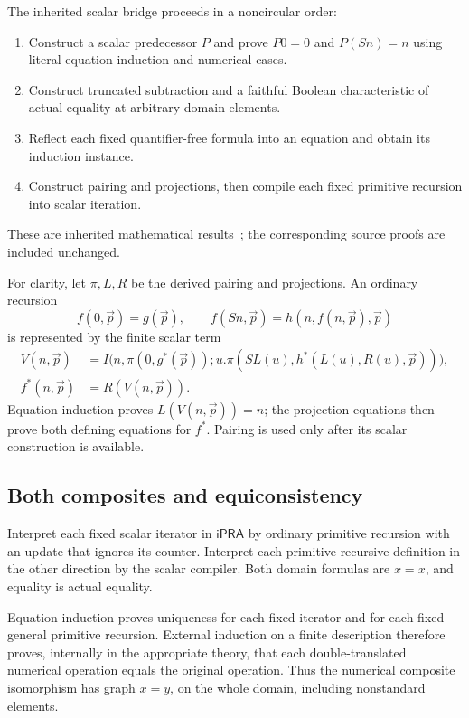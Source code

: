 \documentclass[11pt,letterpaper]{article}
\theoremstyle{definition}
\newcommand{\ipra}{\mathsf{iPRA}}
\begin{document}
The inherited scalar bridge proceeds in a noncircular order:
\begin{enumerate}
\item Construct a scalar predecessor $P$ and prove $P0=0$ and
      $P(Sn)=n$ using literal-equation induction and numerical cases.
\item Construct truncated subtraction and a faithful Boolean
      characteristic of actual equality at arbitrary domain elements.
\item Reflect each fixed quantifier-free formula into an equation
      and obtain its induction instance.
\item Construct pairing and projections, then compile each fixed
      primitive recursion into scalar iteration.
\end{enumerate}
These are inherited mathematical results~\cite{erasure,forward,progress};
the corresponding source proofs are included unchanged.

For clarity, let $\pi,L,R$ be the derived pairing and projections.
An ordinary recursion
\[
 f(0,\vec p)=g(\vec p),\qquad
 f(Sn,\vec p)=h(n,f(n,\vec p),\vec p)
\]
is represented by the finite scalar term
\begin{align*}
 V(n,\vec p)
   &=I\bigl(n,\pi(0,g^*(\vec p));
       u.\pi(SL(u),h^*(L(u),R(u),\vec p))\bigr),\\
 f^*(n,\vec p)&=R(V(n,\vec p)).
\end{align*}
Equation induction proves $L(V(n,\vec p))=n$; the projection
equations then prove both defining equations for $f^*$. Pairing
is used only after its scalar construction is available.

\subsection{Both composites and equiconsistency}

Interpret each fixed scalar iterator in $\ipra$ by ordinary
primitive recursion with an update that ignores its counter.
Interpret each primitive recursive definition in the other
direction by the scalar compiler. Both domain formulas are
$x=x$, and equality is actual equality.

Equation induction proves uniqueness for each fixed iterator
and for each fixed general primitive recursion. External
induction on a finite description therefore proves, internally
in the appropriate theory, that each double-translated numerical
operation equals the original operation. Thus the numerical
composite isomorphism has graph $x=y$, on the whole domain,
including nonstandard elements.
\end{document}
